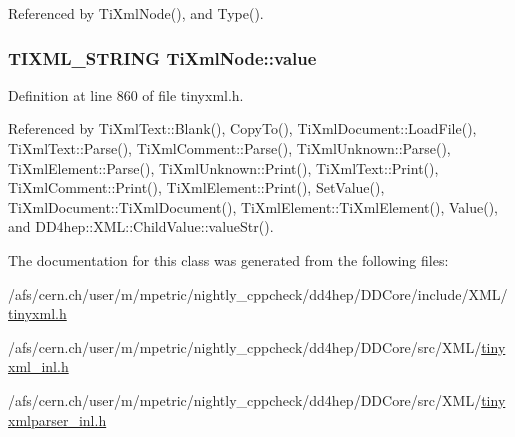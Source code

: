 Referenced by TiXmlNode(), and Type().\hypertarget{class_ti_xml_node_aead528b3cedc33c16a6c539872c7cc8b}{
\subsubsection[{value}]{\setlength{\rightskip}{0pt plus 5cm}TIXML\_\-STRING {\bf TiXmlNode::value}}}
\label{class_ti_xml_node_aead528b3cedc33c16a6c539872c7cc8b}


Definition at line 860 of file tinyxml.h.

Referenced by TiXmlText::Blank(), CopyTo(), TiXmlDocument::LoadFile(), TiXmlText::Parse(), TiXmlComment::Parse(), TiXmlUnknown::Parse(), TiXmlElement::Parse(), TiXmlUnknown::Print(), TiXmlText::Print(), TiXmlComment::Print(), TiXmlElement::Print(), SetValue(), TiXmlDocument::TiXmlDocument(), TiXmlElement::TiXmlElement(), Value(), and DD4hep::XML::ChildValue::valueStr().

The documentation for this class was generated from the following files:\begin{DoxyCompactItemize}
\item 
/afs/cern.ch/user/m/mpetric/nightly\_\-cppcheck/dd4hep/DDCore/include/XML/\hyperlink{tinyxml_8h}{tinyxml.h}\item 
/afs/cern.ch/user/m/mpetric/nightly\_\-cppcheck/dd4hep/DDCore/src/XML/\hyperlink{tinyxml__inl_8h}{tinyxml\_\-inl.h}\item 
/afs/cern.ch/user/m/mpetric/nightly\_\-cppcheck/dd4hep/DDCore/src/XML/\hyperlink{tinyxmlparser__inl_8h}{tinyxmlparser\_\-inl.h}\end{DoxyCompactItemize}

